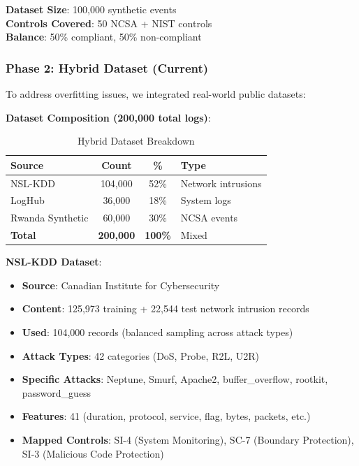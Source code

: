 \documentclass[11pt,conference]{IEEEtran}
\begin{document}
\textbf{Dataset Size}: 100,000 synthetic events \\
\textbf{Controls Covered}: 50 NCSA + NIST controls \\
\textbf{Balance}: 50\% compliant, 50\% non-compliant

\subsubsection{Phase 2: Hybrid Dataset (Current)}

To address overfitting issues, we integrated real-world public datasets:

\textbf{Dataset Composition (200,000 total logs)}:

\begin{table}[h]
\centering
\caption{Hybrid Dataset Breakdown}
\begin{tabular}{|l|c|c|l|}
\hline
\textbf{Source} & \textbf{Count} & \textbf{\%} & \textbf{Type} \\
\hline
NSL-KDD & 104,000 & 52\% & Network intrusions \\
\hline
LogHub & 36,000 & 18\% & System logs \\
\hline
Rwanda Synthetic & 60,000 & 30\% & NCSA events \\
\hline
\textbf{Total} & \textbf{200,000} & \textbf{100\%} & Mixed \\
\hline
\end{tabular}
\end{table}

\textbf{NSL-KDD Dataset}:
\begin{itemize}
    \item \textbf{Source}: Canadian Institute for Cybersecurity
    \item \textbf{Content}: 125,973 training + 22,544 test network intrusion records
    \item \textbf{Used}: 104,000 records (balanced sampling across attack types)
    \item \textbf{Attack Types}: 42 categories (DoS, Probe, R2L, U2R)
    \item \textbf{Specific Attacks}: Neptune, Smurf, Apache2, buffer\_overflow, rootkit, password\_guess
    \item \textbf{Features}: 41 (duration, protocol, service, flag, bytes, packets, etc.)
    \item \textbf{Mapped Controls}: SI-4 (System Monitoring), SC-7 (Boundary Protection), SI-3 (Malicious Code Protection)
\end{itemize}
\end{document}
